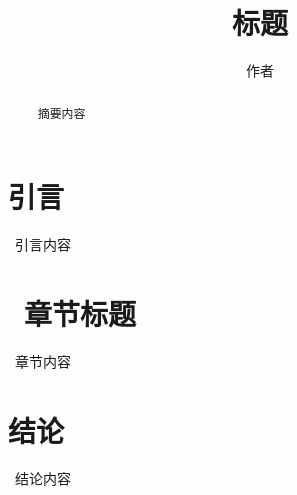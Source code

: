 \documentclass{article}
\title{~标题~}
\author{~作者~}
\begin{document}
\begin{CJK}{UTF8}{gbsn}
  \maketitle

  \renewcommand{\abstractname}{摘要}
	\renewcommand{\figurename}{图}
	\renewcommand{\refname}{参考文献}

	

  \begin{abstract}
		~摘要内容~
  \end{abstract}

  \newpage
  \section{引言}
	~引言内容~


	\section{~章节标题~}
	~章节内容~


	\section{结论}
	~结论内容~


	

	\end{CJK}
\end{document}

